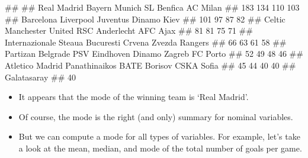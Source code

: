\documentclass[
]{book}
\newenvironment{Shaded}{\begin{snugshade}}{\end{snugshade}}
\newcommand{\AttributeTok}[1]{\textcolor[rgb]{0.77,0.63,0.00}{#1}}
\newcommand{\DecValTok}[1]{\textcolor[rgb]{0.00,0.00,0.81}{#1}}
\newcommand{\FunctionTok}[1]{\textcolor[rgb]{0.00,0.00,0.00}{#1}}
\newcommand{\NormalTok}[1]{#1}
\newcommand{\SpecialCharTok}[1]{\textcolor[rgb]{0.00,0.00,0.00}{#1}}
\begin{document}
\begin{Shaded}
\end{Shaded}

\begin{Shaded}
\begin{Highlighting}[]
\NormalTok{\#\# }
\NormalTok{\#\#       Real Madrid     Bayern Munich        SL Benfica          AC Milan }
\NormalTok{\#\#               183               134               110               103 }
\NormalTok{\#\#         Barcelona         Liverpool          Juventus       Dinamo Kiev }
\NormalTok{\#\#               101                97                87                82 }
\NormalTok{\#\#            Celtic Manchester United    RSC Anderlecht          AFC Ajax }
\NormalTok{\#\#                81                81                75                71 }
\NormalTok{\#\#    Internazionale  Steaua Bucuresti     Crvena Zvezda           Rangers }
\NormalTok{\#\#                66                63                61                58 }
\NormalTok{\#\# Partizan Belgrade     PSV Eindhoven     Dinamo Zagreb          FC Porto }
\NormalTok{\#\#                52                49                48                46 }
\NormalTok{\#\#   Atletico Madrid     Panathinaikos      BATE Borisov        CSKA Sofia }
\NormalTok{\#\#                45                44                40                40 }
\NormalTok{\#\#       Galatasaray }
\NormalTok{\#\#                40}
\end{Highlighting}
\end{Shaded}

\begin{itemize}
\item
  It appears that the mode of the winning team is `Real Madrid'.
\item
  Of course, the mode is the right (and only) summary for nominal variables.
\item
  But we can compute a mode for all types of variables. For example, let's take a look at the mean, median, and mode of the total number of goals per game.
\end{itemize}
\end{document}

